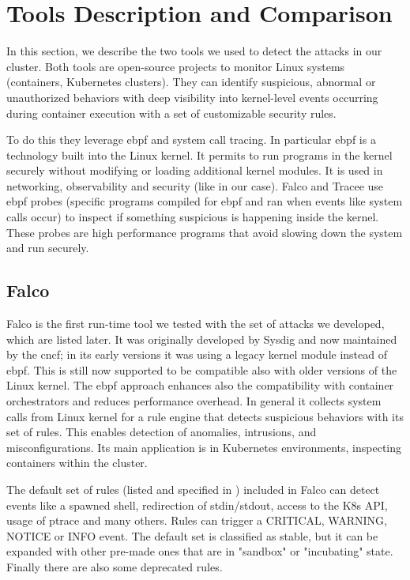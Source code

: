 \section{Tools Description and Comparison}
\label{sec:tools}

In this section, we describe the two tools we used to detect the attacks in our cluster. Both tools are open-source projects to monitor Linux systems (containers, Kubernetes clusters). They can identify suspicious, abnormal or unauthorized behaviors with deep visibility into kernel-level events occurring during container execution with a set of customizable security rules.

To do this they leverage \ac{ebpf} and system call tracing. In particular \ac{ebpf} is a technology built into the Linux kernel. It permits to run programs in the kernel securely without modifying or loading additional kernel modules. It is used in networking, observability and security (like in our case). Falco and Tracee use \ac{ebpf} probes (specific programs compiled for \ac{ebpf} and ran when events like system calls occur) to inspect if something suspicious is happening inside the kernel. These probes are high performance programs that avoid slowing down the system and run securely.


\subsection{Falco}
Falco is the first run-time tool we tested with the set of attacks we developed, which are listed later. It was originally developed by Sysdig and now maintained by the \ac{cncf}; in its early versions it was using a legacy kernel module instead of \ac{ebpf}. This is still now supported to be compatible also with older versions of the Linux kernel. The \ac{ebpf} approach enhances also the compatibility with container orchestrators and reduces performance overhead. In general it collects system calls from Linux kernel for a rule engine that detects suspicious behaviors with its set of rules. This enables detection of anomalies, intrusions, and misconfigurations. Its main application is in Kubernetes environments, inspecting containers within the cluster.

The default set of rules (listed and specified in \cite{falcoRules}) included in Falco can detect events like a spawned shell, redirection of stdin/stdout, access to the K8s API, usage of ptrace and many others. Rules can trigger a CRITICAL, WARNING, NOTICE or INFO event. The default set is classified as stable, but it can be expanded with other pre-made ones that are in "sandbox" or "incubating" state. Finally there are also some deprecated rules.

